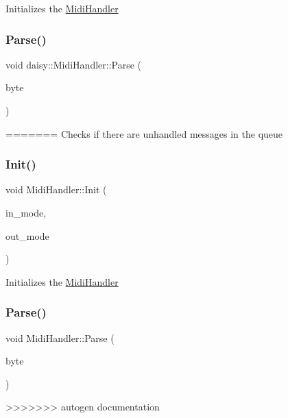 Initializes the \hyperlink{classdaisy_1_1_midi_handler}{Midi\+Handler} \mbox{\label{classdaisy_1_1_midi_handler_a6ad7f3e96e321775266f4e58d356c2a9}} 
\subsubsection{\texorpdfstring{Parse()}{Parse()}}
{\footnotesize\ttfamily void daisy\+::\+Midi\+Handler\+::\+Parse (\begin{DoxyParamCaption}\item[{uint8\+\_\+t}]{byte }\end{DoxyParamCaption})}
=======
Checks if there are unhandled messages in the queue \mbox{\label{classdaisy_1_1_midi_handler_ace46e147ccd584f0bc9aecd3cde9345d}} 
\subsubsection{\texorpdfstring{Init()}{Init()}}
{\footnotesize\ttfamily void Midi\+Handler\+::\+Init (\begin{DoxyParamCaption}\item[{\hyperlink{classdaisy_1_1_midi_handler_acc2df91e9c18571da6edecaec4fbc7fe}{Midi\+Input\+Mode}}]{in\+\_\+mode,  }\item[{Midi\+Output\+Mode}]{out\+\_\+mode }\end{DoxyParamCaption})}

Initializes the \hyperlink{classdaisy_1_1_midi_handler}{Midi\+Handler} \mbox{\label{classdaisy_1_1_midi_handler_a662328ecadf42d9d2424e845fcd71915}} 
\subsubsection{\texorpdfstring{Parse()}{Parse()}}
{\footnotesize\ttfamily void Midi\+Handler\+::\+Parse (\begin{DoxyParamCaption}\item[{uint8\+\_\+t}]{byte }\end{DoxyParamCaption})}
>>>>>>> autogen documentation

